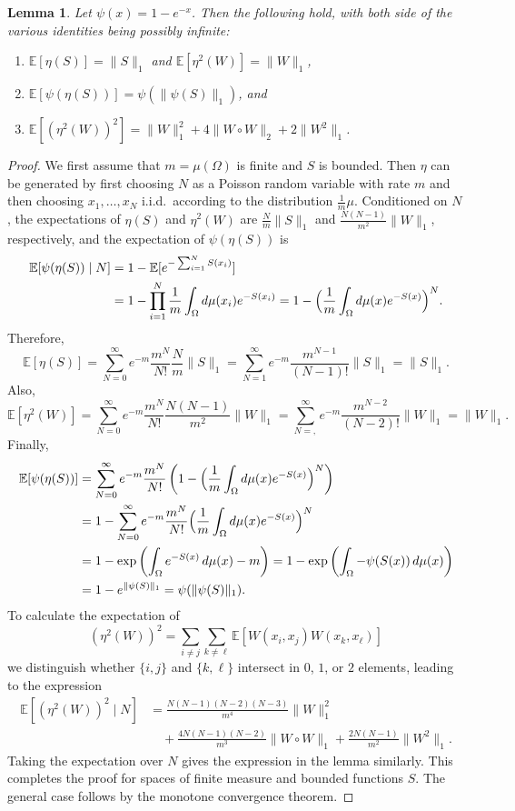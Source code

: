 \documentclass{amsart}
\numberwithin{equation}{section}
\numberwithin{figure}{section}
\newtheorem{lemma}[theorem]{Lemma}
\theoremstyle{definition}
\theoremstyle{remark}
\newcommand{\EE}{\mathbb{E}}
\begin{document}
\begin{lemma}\label{lem:PP-moments}
Let $\psi(x)=1-e^{-x}$. Then the following hold, with both side of the
various identities being possibly infinite:
\begin{enumerate}
\item $\EE[\eta(S)]=\|S\|_1$ and $\EE[\eta^2(W)]=\|W\|_1$,
    \label{EofEtaS+W}
\item $\EE[\psi(\eta(S))]=\psi(\|\psi(S)\|_1)$, and \label{EofpsiEtaS}
\item $\EE[(\eta^2(W))^2]=\|W\|_1^2+4\|W\circ W\|_2+2\|W^2\|_1$.
    \label{EofEtaW2}
\end{enumerate}
\end{lemma}
\begin{proof}
We first assume that $m=\mu(\Omega)$ is finite and $S$ is bounded. Then
$\eta$ can be generated by first choosing $N$ as a Poisson random variable
with rate $m$ and then choosing $x_1,\dots,x_N$ i.i.d.\ according to the
distribution $\frac 1m\mu$. Conditioned on $N$, the expectations of $\eta(S)$
and $\eta^2(W)$ are $\frac Nm\|S\|_1$ and $\frac{N(N-1)}{m^2}\|W\|_1$,
respectively, and the expectation of $\psi(\eta(S))$ is
\begin{align*}
\EE[\psi(\eta(S))\mid N]&= 1 - \EE[e^{-\sum_{i=1}^N S(x_i)}]\\
&=1-\prod_{i=1}^N \frac 1m\int_{\Omega} d\mu(x_i)e^{-S(x_i)}
=1-\Bigl(\frac 1m\int_{\Omega} d\mu(x) e^{-S(x)}\Bigr)^N.
\end{align*}
Therefore,
\[\EE[\eta(S)]=\sum_{N=0}^\infty e^{-m}\frac{m^N}{N!}\frac{N}{m}\|S\|_1=\sum_{N=1}^\infty
e^{-m}\frac{m^{N-1}}{(N-1)!}\|S\|_1=\|S\|_1
.\] Also,
\[\EE[\eta^2(W)]=\sum_{N=0}^\infty e^{-m}\frac{m^N}{N!}\frac{N(N-1)}{m^2}\|W\|_1=\sum_{N=,}^\infty
e^{-m}\frac{m^{N-2}}{(N-2)!}\|W\|_1=\|W\|_1
.\] Finally,
\begin{align*}
\EE[\psi(\eta(S))]&=\sum_{N=0}^\infty e^{-m}\frac{m^N}{N!}\left(1-\Bigl(\frac 1m\int_{\Omega} d\mu(x) e^{-S(x)}\Bigr)^N\right)\\
&=1-\sum_{N=0}^\infty e^{-m}\frac{m^N}{N!}\Bigl(\frac 1m\int_{\Omega} d\mu(x) e^{-S(x)}\Bigr)^N\\
&=1-\exp\left(\int_\Omega e^{-S(x)}\,d\mu(x)-m\right)
=1-\exp\left(\int_\Omega-\psi(S(x))\,d\mu(x)\right)\\
&=1-e^{\|\psi(S)\|_1}=\psi(\|\psi(S)\|_1)
.\end{align*}
To calculate the expectation of
\[
(\eta^2(W))^2=\sum_{i\neq j}\sum_{k\neq \ell}\EE[W(x_i,x_j)W(x_k,x_\ell)]
\]
we distinguish whether $\{i,j\}$ and $\{k,\ell\}$ intersect in $0$, $1$, or
$2$ elements, leading to the expression
\begin{align*}
\EE[(\eta^2(W))^2\mid N]
&= \frac{N(N-1)(N-2)(N-3)}{m^4}\|W\|_1^2\\
&\quad\phantom{}+\frac{4N(N-1)(N-2)}{m^3}\|W\circ W\|_1
+\frac{2N(N-1)}{m^2}\|W^2\|_1.
\end{align*}
Taking the expectation over $N$ gives the expression in the lemma similarly.
This completes the proof for spaces of finite measure and bounded functions
$S$. The general case follows by the monotone convergence theorem.
\end{proof}
\end{document}
